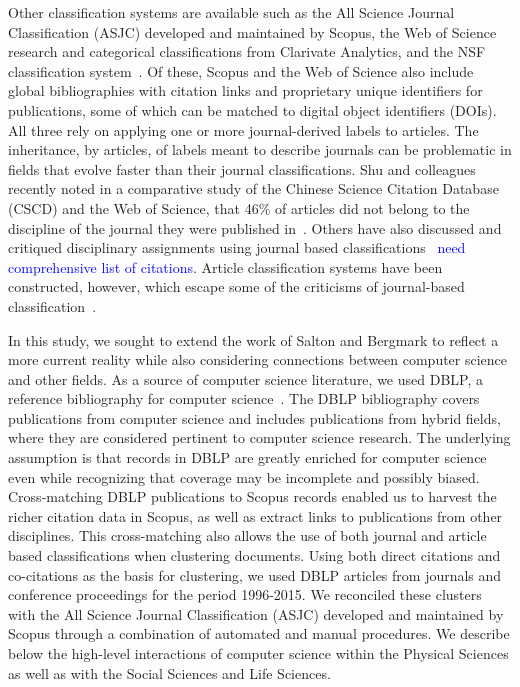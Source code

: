 Other classification systems are available such as the All Science Journal Classification (ASJC) developed and maintained by Scopus, the Web of Science research and categorical classifications from Clarivate Analytics, and the NSF classification system~\cite{nsf_classification}. Of these, Scopus and the Web of Science also include global bibliographies with citation links and proprietary unique identifiers for publications, some of which can be matched to digital object identifiers (DOIs). All three rely on applying one or more journal-derived labels to articles. The inheritance, by articles, of labels meant to describe journals can be problematic in fields that evolve faster than their journal classifications. Shu and colleagues recently noted in a comparative study of the Chinese Science Citation Database (CSCD) and the Web of Science, that 46\% of articles did not belong to the discipline of the journal they were published in~\cite{shu_comparing_2019}. Others have also discussed and critiqued disciplinary assignments using journal based classifications~\cite{wang_large-scale_2016} \textcolor{blue}{need comprehensive list of citations}. Article classification systems have been constructed, however, which escape some of the criticisms of journal-based classification~\cite{traag_louvain_2019,boyack_classification_2014,waltman_new_2012}.
  
In this study, we sought to extend the work of Salton and Bergmark to reflect a more current reality while also considering connections between computer science and other fields. As a source of computer science literature, we used DBLP, a reference bibliography for computer science~\cite{dblp_ref}. The DBLP bibliography covers publications from computer science and includes publications from hybrid fields, where they are considered pertinent to computer science research. The underlying assumption is that records in DBLP are greatly enriched for computer science even while recognizing that coverage may be incomplete and possibly biased. Cross-matching DBLP publications to Scopus records enabled us to harvest the richer citation data in Scopus, as well as extract links to publications from other disciplines. This cross-matching also allows the use of both journal and article based classifications when clustering documents. Using both direct citations and co-citations as the basis for clustering, we used DBLP articles from journals and conference proceedings for the period 1996-2015. We reconciled these clusters with the All Science Journal Classification (ASJC) developed and maintained by Scopus through a combination of automated and manual procedures. We describe below the high-level interactions of computer science within the Physical Sciences as well as with the Social Sciences and Life Sciences. 

